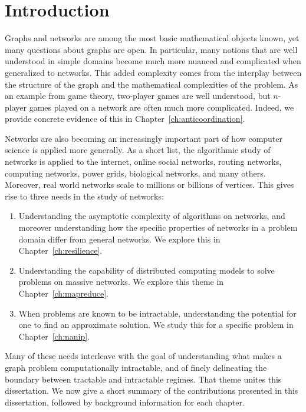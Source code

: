 \chapter{Introduction}
\label{introduction}

Graphs and networks are among the most basic mathematical objects known, yet
many questions about graphs are open. In particular, many notions that are well
understood in simple domains become much more nuanced and complicated when
generalized to networks. This added complexity comes from the interplay between
the structure of the graph and the mathematical complexities of the problem. As
an example from game theory, two-player games are well understood, but
$n$-player games played on a network are often much more complicated. Indeed,
we provide concrete evidence of this in Chapter~\ref{ch:anticoordination}. 

Networks are also becoming an increasingly important part of how computer
science is applied more generally. As a short list, the algorithmic study of
networks is applied to the internet, online social networks, routing networks,
computing networks, power grids, biological networks, and many others.
Moreover, real world networks scale to millions or billions of vertices. This
gives rise to three needs in the study of networks:

\begin{enumerate}
\item Understanding the asymptotic complexity of algorithms on networks, and
moreover understanding how the specific properties of networks in a problem
domain differ from general networks. We explore this in
Chapter~\ref{ch:resilience}.
\item Understanding the capability of distributed computing models to solve
problems on massive networks. We explore this theme in
Chapter~\ref{ch:mapreduce}.  
\item When problems are known to be intractable, understanding the potential
for one to find an approximate solution. We study this for a specific problem
in Chapter~\ref{ch:nanip}.
\end{enumerate}

Many of these needs interleave with the goal of understanding what makes a
graph problem computationally intractable, and of finely delineating the
boundary between tractable and intractable regimes. That theme unites this
dissertation.  We now give a short summary of the contributions presented in
this dissertation, followed by background information for each chapter.

